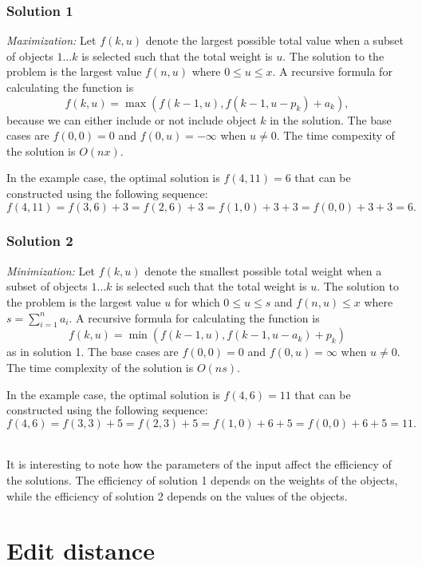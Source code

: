 \subsubsection{Solution 1}

\textit{Maximization:} Let $f(k,u)$
denote the largest possible total value
when a subset of objects $1 \ldots k$ is selected
such that the total weight is $u$.
The solution to the problem is
the largest value
$f(n,u)$ where $0 \le u \le x$.
A recursive formula for calculating
the function is
\[f(k,u) = \max(f(k-1,u),f(k-1,u-p_k)+a_k),\]
because we can either include or not include
object $k$ in the solution.
The base cases are $f(0,0)=0$ and $f(0,u)=-\infty$
when $u \neq 0$. The time compexity of
the solution is $O(nx)$.

In the example case, the optimal solution is
$f(4,11)=6$ that can be constructed
using the following sequence:
\[f(4,11)=f(3,6)+3=f(2,6)+3=f(1,0)+3+3=f(0,0)+3+3=6.\]

\subsubsection{Solution 2}

\textit{Minimization:} Let $f(k,u)$
denote the smallest possible total weight
when a subset of objects
$1 \ldots k$ is selected such
that the total weight is $u$.
The solution to the problem is the
largest value $u$
for which  $0 \le u \le s$ and $f(n,u) \le x$
where $s=\sum_{i=1}^n a_i$.
A recursive formula for calculating the function is
\[f(k,u) = \min(f(k-1,u),f(k-1,u-a_k)+p_k)\]
as in solution 1.
The base cases are $f(0,0)=0$ and $f(0,u)=\infty$
when $u \neq 0$.
The time complexity of the solution is $O(ns)$.

In the example case, the optimal solution is $f(4,6)=11$
that can be constructed using the following sequence:
\[f(4,6)=f(3,3)+5=f(2,3)+5=f(1,0)+6+5=f(0,0)+6+5=11.\]

~\\
It is interesting to note how the parameters of the input
affect the efficiency of the solutions.
The efficiency of solution 1 depends on the weights
of the objects, while the efficiency of solution 2
depends on the values of the objects.

\section{Edit distance}


